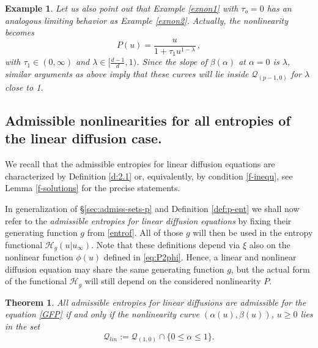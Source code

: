 \documentclass[reqno]{amsart}
\newtheorem{theorem}[lemma]{Theorem}
\newtheorem{example}[lemma]{Example}
\renewcommand{\H}{{\mathcal{H}}}
\begin{document}
\begin{example}\label{exnon3}
Let us also point out that Example \ref{exnon1} with $\tau_o=0$ has an analogous limiting behavior as Example \ref{exnon2}. Actually, the nonlinearity becomes
$$
P(u)=\frac{u}{1+\tau_1 u^{1-\lambda}}\,,
$$
with $\tau_1\in (0,\infty)$ and $\lambda\in [\frac{d-1}{d},1)$. Since the slope of $\beta(\alpha)$ at $\alpha=0$ is $\lambda$, similar arguments as above imply that these curves will lie inside  $\mathcal{Q}_{(p-1,0)}$ for $\lambda$ close to 1.
\end{example}




\subsection{Admissible nonlinearities for all entropies of the linear diffusion case.}\label{sec:admiss-sets-for alllin}

We recall that the admissible entropies for linear diffusion equations are characterized by Definition \ref{d:2.1} or, equivalently, by condition \eqref{f-inequ}, see Lemma \ref{f-solutions} for the precise statements.

In generalization of \S\ref{sec:admiss-sets-p} and Definition \ref{def:p-ent} we shall now refer to the \emph{admissible entropies for linear diffusion equations} by fixing their generating function $g$ from \eqref{entrof}. All of those $g$ will then be used in the entropy functional $\H_g(u|u_\infty)$. Note that these definitions depend via $\xi$ also on the nonlinear function $\phi(u)$ defined in \eqref{eq:P2phi}. Hence, a linear and nonlinear diffusion equation may share the same generating function $g$, but the actual form of the functional $\H_g$ will still depend on the considered nonlinearity $P$. 

\begin{theorem}\label{thmlinentropy}
All admissible entropies for linear diffusions are admissible for the equation \eqref{GFP} if and only if the nonlinearity curve $(\alpha(u),\beta(u))$, $u\ge 0$ lies in the set
$$
\mathcal{Q}_{lin}:= \mathcal{Q}_{(1,0)}\cap \{0\le \alpha\le 1\}.
$$
\end{theorem}
\end{document}
